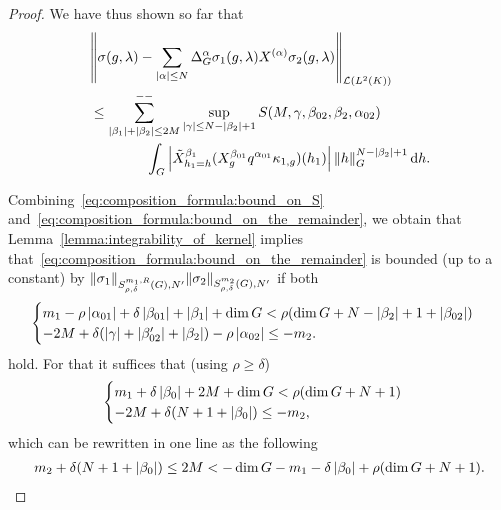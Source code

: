 \begin{proof}
    We have thus shown so far that
    \begin{align}
        &\norm [\Lin {\Lebesgue 2 \CompactGroup}] {\sigma(g, \lambda) - \sum_{\abs \alpha \leq N} \DifferenceOperatorOrder \alpha \sigma_1(g, \lambda) \TaylorLeftDifferentialOperator \alpha \sigma_2(g, \lambda)} \notag\\
        &\leq
        \lcsum{\abs {\beta_1} + \abs {\beta_2} \leq 2M}
        \sup_{\abs \gamma \leq N - \abs {\beta_2} + 1}
        S(M, \gamma, \beta_{02}, \beta_2, \alpha_{02}) \notag\\
        &\qquad \qquad
        \int_\Group \abs {\RightDifferentialOperator[h_1 = h] {\beta_1} (\LeftDifferentialOperator [g] {\beta_{01}} q^{\alpha_{01}} \kappa_{1, g})(h_1)} \norm [\Group] h^{N - \abs {\beta_2} + 1} \dd h.
        \label{eq:composition_formula:bound_on_the_remainder}
    \end{align}

    Combining~\eqref{eq:composition_formula:bound_on_S} and~\eqref{eq:composition_formula:bound_on_the_remainder},
    we obtain that
    Lemma~\eqref{lemma:integrability_of_kernel} implies
    that~\eqref{eq:composition_formula:bound_on_the_remainder} is bounded (up to a constant) by $\SymbolSemiNorm {m_1, R} {\rho, \delta} {N'} {\sigma_1} \SymbolSemiNorm {m_2} {\rho, \delta} {N'} {\sigma_2}$ if both
    \begin{align*}
        \begin{cases}
            m_1 - \rho \abs {\alpha_{01}} + \delta \abs {\beta_{01}} + \abs {\beta_1} + \dim \Group < \rho (\dim \Group + N - \abs {\beta_2} + 1 + \abs{\beta_{02}})\\
            -2 M + \delta(\abs \gamma + \abs {\beta'_{02}} + \abs {\beta_2}) - \rho \abs {\alpha_{02}} \leq -m_2.
        \end{cases}
    \end{align*}
    hold.
    For that it suffices that (using $\rho \geq \delta$)
    \begin{align*}
        \begin{cases}
            m_1 + \delta \abs {\beta_{0}} + 2 M + \dim \Group < \rho (\dim \Group + N + 1)\\
            -2M + \delta(N + 1 + \abs {\beta_{0}}) \leq -m_2,
        \end{cases}
    \end{align*}
    which can be rewritten in one line as the following
    \begin{align}
        m_2 + \delta(N + 1 + \abs {\beta_0})
        \leq 2M <
        -\dim \Group - m_1 - \delta \abs {\beta_0} + \rho (\dim \Group + N + 1).
        \label{eq:composition_formula:second_condition_on_M}
    \end{align}
\end{proof}

